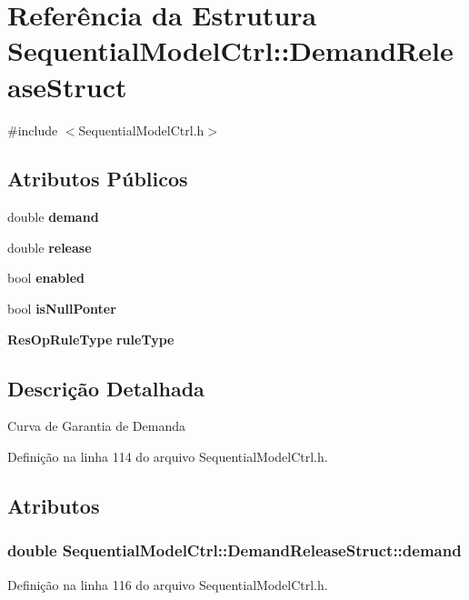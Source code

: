 \section{Referência da Estrutura Sequential\+Model\+Ctrl\+:\+:Demand\+Release\+Struct}
\label{struct_sequential_model_ctrl_1_1_demand_release_struct}


{\ttfamily \#include $<$Sequential\+Model\+Ctrl.\+h$>$}

\subsection*{Atributos Públicos}
\begin{DoxyCompactItemize}
\item 
double {\bf demand}
\item 
double {\bf release}
\item 
bool {\bf enabled}
\item 
bool {\bf is\+Null\+Ponter}
\item 
{\bf Res\+Op\+Rule\+Type} {\bf rule\+Type}
\end{DoxyCompactItemize}


\subsection{Descrição Detalhada}
Curva de Garantia de Demanda 

Definição na linha 114 do arquivo Sequential\+Model\+Ctrl.\+h.



\subsection{Atributos}
\subsubsection[{demand}]{\setlength{\rightskip}{0pt plus 5cm}double Sequential\+Model\+Ctrl\+::\+Demand\+Release\+Struct\+::demand}\label{struct_sequential_model_ctrl_1_1_demand_release_struct_af11bef32eb1fb5b0ba4e310ae77da684}


Definição na linha 116 do arquivo Sequential\+Model\+Ctrl.\+h.

